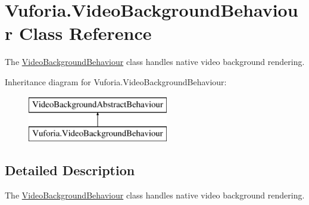 \hypertarget{class_vuforia_1_1_video_background_behaviour}{}\section{Vuforia.\+Video\+Background\+Behaviour Class Reference}
\label{class_vuforia_1_1_video_background_behaviour}


The \hyperlink{class_vuforia_1_1_video_background_behaviour}{Video\+Background\+Behaviour} class handles native video background rendering.  


Inheritance diagram for Vuforia.\+Video\+Background\+Behaviour\+:\begin{figure}[H]
\begin{center}
\leavevmode
\includegraphics[height=2.000000cm]{class_vuforia_1_1_video_background_behaviour}
\end{center}
\end{figure}


\subsection{Detailed Description}
The \hyperlink{class_vuforia_1_1_video_background_behaviour}{Video\+Background\+Behaviour} class handles native video background rendering. 

